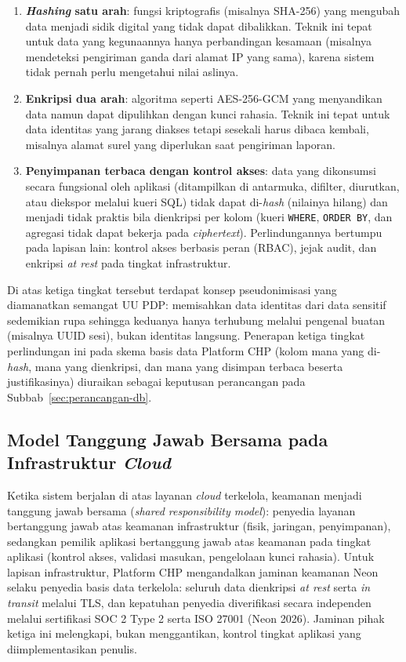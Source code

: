\begin{enumerate}[leftmargin=2cm]
  \item \textbf{\textit{Hashing} satu arah}: fungsi kriptografis (misalnya SHA-256) yang mengubah data menjadi sidik digital yang tidak dapat dibalikkan. Teknik ini tepat untuk data yang kegunaannya hanya perbandingan kesamaan (misalnya mendeteksi pengiriman ganda dari alamat IP yang sama), karena sistem tidak pernah perlu mengetahui nilai aslinya.
  \item \textbf{Enkripsi dua arah}: algoritma seperti AES-256-GCM yang menyandikan data namun dapat dipulihkan dengan kunci rahasia. Teknik ini tepat untuk data identitas yang jarang diakses tetapi sesekali harus dibaca kembali, misalnya alamat surel yang diperlukan saat pengiriman laporan.
  \item \textbf{Penyimpanan terbaca dengan kontrol akses}: data yang dikonsumsi secara fungsional oleh aplikasi (ditampilkan di antarmuka, difilter, diurutkan, atau diekspor melalui kueri SQL) tidak dapat di-\textit{hash} (nilainya hilang) dan menjadi tidak praktis bila dienkripsi per kolom (kueri \texttt{WHERE}, \texttt{ORDER BY}, dan agregasi tidak dapat bekerja pada \textit{ciphertext}). Perlindungannya bertumpu pada lapisan lain: kontrol akses berbasis peran (RBAC), jejak audit, dan enkripsi \textit{at rest} pada tingkat infrastruktur.
\end{enumerate}

Di atas ketiga tingkat tersebut terdapat konsep pseudonimisasi yang diamanatkan semangat UU PDP: memisahkan data identitas dari data sensitif sedemikian rupa sehingga keduanya hanya terhubung melalui pengenal buatan (misalnya UUID sesi), bukan identitas langsung. Penerapan ketiga tingkat perlindungan ini pada skema basis data Platform CHP (kolom mana yang di-\textit{hash}, mana yang dienkripsi, dan mana yang disimpan terbaca beserta justifikasinya) diuraikan sebagai keputusan perancangan pada Subbab~\ref{sec:perancangan-db}.

\subsection{Model Tanggung Jawab Bersama pada Infrastruktur \textit{Cloud}}
\label{subsec:shared-responsibility}

Ketika sistem berjalan di atas layanan \textit{cloud} terkelola, keamanan menjadi tanggung jawab bersama (\textit{shared responsibility model}): penyedia layanan bertanggung jawab atas keamanan infrastruktur (fisik, jaringan, penyimpanan), sedangkan pemilik aplikasi bertanggung jawab atas keamanan pada tingkat aplikasi (kontrol akses, validasi masukan, pengelolaan kunci rahasia). Untuk lapisan infrastruktur, Platform CHP mengandalkan jaminan keamanan Neon selaku penyedia basis data terkelola: seluruh data dienkripsi \textit{at rest} serta \textit{in transit} melalui TLS, dan kepatuhan penyedia diverifikasi secara independen melalui sertifikasi SOC 2 Type 2 serta ISO 27001 (Neon 2026). Jaminan pihak ketiga ini melengkapi, bukan menggantikan, kontrol tingkat aplikasi yang diimplementasikan penulis.


